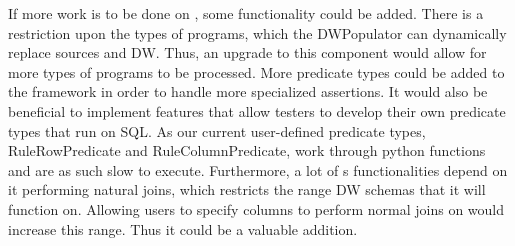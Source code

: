 If more work is to be done on \FW{}, some functionality could be added. There is a restriction upon the types of programs, which the DWPopulator can dynamically replace sources and DW. Thus, an upgrade to this component would allow for more types of programs to be processed. More predicate types could be added to the framework in order to handle more specialized assertions. It would also be beneficial to implement features that allow testers to develop their own predicate types that run on SQL. As our current user-defined predicate types, RuleRowPredicate and RuleColumnPredicate, work through python functions and are as such slow to execute. Furthermore, a lot of \FW{}s functionalities depend on it performing natural joins, which restricts the range DW schemas that it will function on. Allowing users to specify columns to perform normal joins on would increase this range. Thus it could be a valuable addition.

